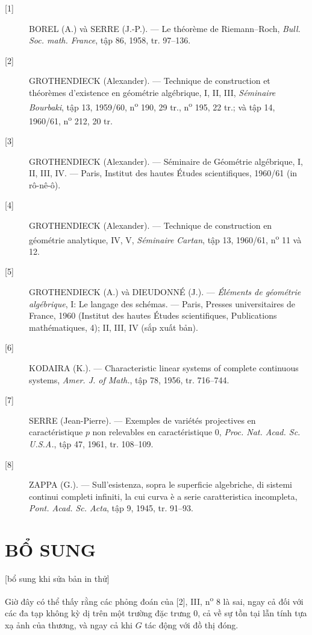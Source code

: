 \begin{description}
\item[{[1]}] BOREL (A.) và SERRE (J.-P.). --- Le théorème de Riemann--Roch,
\emph{Bull. Soc. math. France}, tập 86, 1958, tr. 97--136.

\item[{[2]}] GROTHENDIECK (Alexander). --- Technique de construction et
théorèmes d'existence en géométrie algébrique, I, II, III, \emph{Séminaire
Bourbaki}, tập 13, 1959/60, n\textsuperscript{o} 190, 29 tr.,
n\textsuperscript{o} 195, 22 tr.; và tập 14, 1960/61,
n\textsuperscript{o} 212, 20 tr.

\item[{[3]}] GROTHENDIECK (Alexander). --- Séminaire de Géométrie algébrique,
I, II, III, IV. --- Paris, Institut des hautes Études scientifiques, 1960/61
(in rô-nê-ô).

\item[{[4]}] GROTHENDIECK (Alexander). --- Technique de construction en
géométrie analytique, IV, V, \emph{Séminaire Cartan}, tập 13, 1960/61,
n\textsuperscript{o} 11 và 12.

\item[{[5]}] GROTHENDIECK (A.) và DIEUDONNÉ (J.). --- \emph{Éléments de
géométrie algébrique}, I: Le langage des schémas. --- Paris, Presses
universitaires de France, 1960 (Institut des hautes Études scientifiques,
Publications mathématiques, 4); II, III, IV (sắp xuất bản).

\item[{[6]}] KODAIRA (K.). --- Characteristic linear systems of complete
continuous systems, \emph{Amer. J. of Math.}, tập 78, 1956, tr. 716--744.

\item[{[7]}] SERRE (Jean-Pierre). --- Exemples de variétés projectives en
caractéristique $p$ non relevables en caractéristique 0, \emph{Proc. Nat. Acad.
Sc. U.S.A.}, tập 47, 1961, tr. 108--109.

\item[{[8]}] ZAPPA (G.). --- Sull'esistenza, sopra le superficie algebriche, di
sistemi continui completi infiniti, la cui curva è a serie caratteristica
incompleta, \emph{Pont. Acad. Sc. Acta}, tập 9, 1945, tr. 91--93.
\end{description}

\section*{BỔ SUNG}
\begin{center}
{\small [bổ sung khi sửa bản in thử]}
\end{center}

Giờ đây có thể thấy rằng các phỏng đoán của [2], III,
n\textsuperscript{o} 8 là sai, ngay cả đối với các đa tạp không kỳ dị trên một
trường đặc trưng 0, cả về sự tồn tại lẫn tính tựa xạ ảnh của thương, và ngay cả
khi $G$ tác động với đồ thị đóng.
